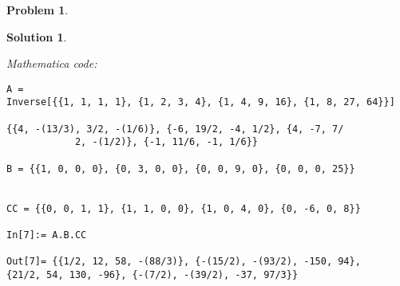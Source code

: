 \documentclass{article}
\theoremstyle{definition}
\newtheorem*{prob*}{Problem}
\newtheorem*{sln*}{Solution}
\begin{document}
\begin{prob*}
\begin{sln*}
\begin{enumerate}
\begin{enumerate}
				\textit{Mathematica code:}
				\begin{lstlisting}
A = 
Inverse[{{1, 1, 1, 1}, {1, 2, 3, 4}, {1, 4, 9, 16}, {1, 8, 27, 64}}]
				
{{4, -(13/3), 3/2, -(1/6)}, {-6, 19/2, -4, 1/2}, {4, -7, 7/
			2, -(1/2)}, {-1, 11/6, -1, 1/6}}
				
B = {{1, 0, 0, 0}, {0, 3, 0, 0}, {0, 0, 9, 0}, {0, 0, 0, 25}}
				
				
CC = {{0, 0, 1, 1}, {1, 1, 0, 0}, {1, 0, 4, 0}, {0, -6, 0, 8}}
						
In[7]:= A.B.CC
				
Out[7]= {{1/2, 12, 58, -(88/3)}, {-(15/2), -(93/2), -150, 94}, 
{21/2, 54, 130, -96}, {-(7/2), -(39/2), -37, 97/3}}
				\end{lstlisting}
			\end{enumerate}
		\end{enumerate}
		
	\end{sln*}






\end{prob*}

\newpage
\end{document}
